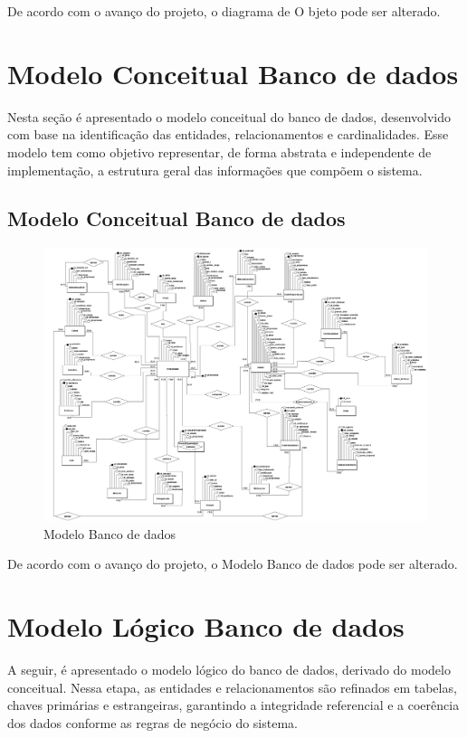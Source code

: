 \documentclass[
  a4paper,%
  12pt,%
  english,%
  brazilian,%
]{article}
\begin{document}
De acordo com o avanço do projeto, o diagrama de O  bjeto pode ser alterado.
\newpage
\section*{Modelo Conceitual Banco de dados}
Nesta seção é apresentado o modelo conceitual do banco de dados, desenvolvido com base na identificação das entidades, relacionamentos e cardinalidades. Esse modelo tem como objetivo representar, de forma abstrata e independente de implementação, a estrutura geral das informações que compõem o sistema.
\subsection*{Modelo Conceitual Banco de dados}

     \begin{figure}[h]
\centering
\caption{Modelo Banco de dados}%
\label{fig:modelo-conceitual}
\includegraphics[width=1.1\textwidth]{Logos/Conceitual_buffs.png}
\end{figure}
De acordo com o avanço do projeto, o Modelo Banco de dados pode ser alterado.

\newpage
\section*{Modelo Lógico Banco de dados}
A seguir, é apresentado o modelo lógico do banco de dados, derivado do modelo conceitual. Nessa etapa, as entidades e relacionamentos são refinados em tabelas, chaves primárias e estrangeiras, garantindo a integridade referencial e a coerência dos dados conforme as regras de negócio do sistema.
\end{document}

